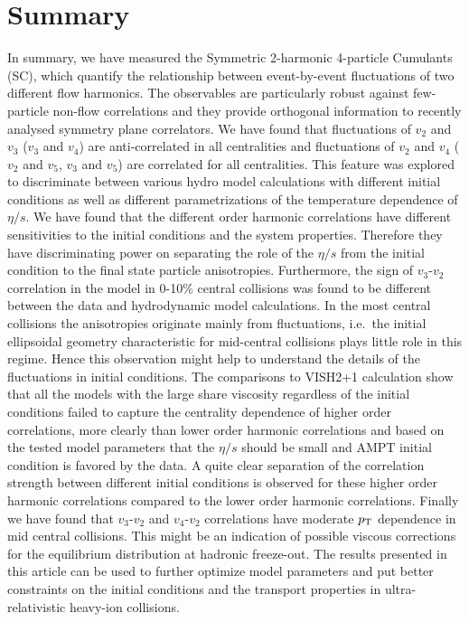 \documentclass[ALICE,manyauthors]{cernphprep}
\begin{document}
\section{Summary}
\label{sec:summary}
In summary, we have measured the Symmetric 2-harmonic 4-particle Cumulants (SC), which quantify the relationship between event-by-event fluctuations of two different flow harmonics. The observables are particularly robust against few-particle non-flow correlations and they provide orthogonal information to recently analysed symmetry plane correlators. We have found that fluctuations of $v_2$ and $v_3$ ($v_3$ and $v_4$) are anti-correlated in all centralities and fluctuations of $v_2$ and $v_4$ ( $v_2$ and $v_5$, $v_3$ and $v_5$) are correlated for all centralities. 
This feature was explored to discriminate between various hydro model calculations with different initial conditions as well as different parametrizations of the temperature dependence of $\eta/s$.
We have found that the different order harmonic correlations have different sensitivities to the initial conditions and the system properties. Therefore they have discriminating power on separating the role of the $\eta/s$  from the initial condition to the final state particle anisotropies.
Furthermore, the sign of $v_3$-$v_2$ correlation in the model in 0-10\% central collisions was found to be different between the data and hydrodynamic model calculations.
In the most central collisions the anisotropies originate mainly from fluctuations, i.e.\ the initial ellipsoidal geometry characteristic for mid-central collisions plays little role in this regime. Hence this observation might help to understand the details of the fluctuations in initial conditions. 
The comparisons to VISH2+1 calculation show that all the models with the large share viscosity regardless of the initial conditions failed to capture the centrality dependence of higher order correlations, more clearly than lower order harmonic correlations and based on the tested model parameters that the $\eta/s$ should be small and AMPT initial condition is favored by the data. A quite clear separation of the correlation strength between different initial conditions is observed for these higher order harmonic correlations compared to the lower order harmonic correlations.
Finally we have found that $v_3$-$v_2$ and $v_4$-$v_2$ correlations have moderate $p_{\rm T}$ dependence in mid central collisions. This might be an indication of possible viscous corrections for the equilibrium distribution at hadronic freeze-out.
The results presented in this article can be used to further optimize model parameters and put better constraints on the initial conditions and the transport properties in ultra-relativistic heavy-ion collisions.
\end{document}
